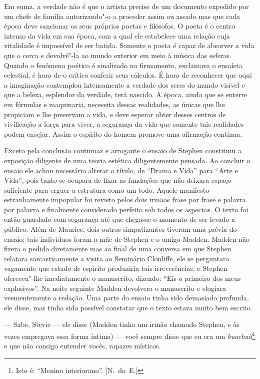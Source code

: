 Em suma, a verdade não é que o artista precise de um documento
expedido por um chefe de família autorizando"-o a proceder assim ou
assado mas que cada época deve sancionar os seus próprios poetas e
filósofos.  O poeta é o centro intenso da vida em sua época, com a qual
ele estabelece uma relação cuja vitalidade é impossível de ser batida.
Somente o poeta é capaz de absorver a vida que o cerca e devolvê"-la ao
mundo exterior em meio à música das esferas.  Quando o fenômeno poético
é sinalizado no firmamento, exclamava o ensaísta celestial, é hora de o
crítico conferir seus cálculos.  É hora de reconhecer que aqui a
imaginação contemplou intensamente a verdade dos seres do mundo visível
e que a beleza, esplendor da verdade, terá nascido.  A época, ainda que
se enterre em fórmulas e maquinaria, necessita dessas realidades, as
únicas que lhe propiciam e lhe preservam a vida, e deve esperar obter
desses centros de vivificação a força para viver, a segurança da vida
que somente tais realidades podem ensejar.  Assim o espírito do homem
promove uma afirmação contínua.

Exceto pela conclusão contumaz e arrogante o ensaio de Stephen
constituiu a exposição diligente de uma teoria estética diligentemente
pensada.  Ao concluir o ensaio ele achou necessário alterar o título,
de “Drama e Vida” para “Arte e Vida”, pois tanto se ocupara de fixar
as fundações que não deixara espaço suficiente para erguer a estrutura
como um todo.  Aquele manifesto estranhamente impopular foi revisto
pelos dois irmãos frase por frase e palavra por palavra e finalmente
considerado perfeito sob todos os aspectos.  O texto foi então guardado
com segurança até que chegasse o momento de ser levado a público.  Além
de Maurice, dois outros simpatizantes tiveram uma prévia do ensaio; tais
indivíduos foram a mãe de Stephen e o amigo Madden.  Madden não fizera
o pedido diretamente mas ao final de uma conversa em que Stephen
relatara sarcasticamente a visita ao Seminário Clonliffe, ele se
perguntara vagamente que estado de espírito produziria tais
irreverências, e Stephen ofereceu"-lhe imediatamente o manuscrito,
dizendo: “Eis o primeiro dos meus explosivos”.  Na noite seguinte
Madden devolvera o manuscrito e elogiara veementemente a redação.  Uma
parte do ensaio tinha sido demasiado profunda, ele disse, mas tinha
sido possível constatar que o texto estava muito bem escrito.

--- Sabe, Stevie --- ele disse (Madden tinha um irmão chamado
Stephen, e às vezes empregava essa forma íntima) --- você sempre disse
que eu era um \textit{buachail}\footnote{ Isto é: “Menino interiorano”. [N.~do~E.]} 
e que não consigo entender vocês, rapazes místicos.

